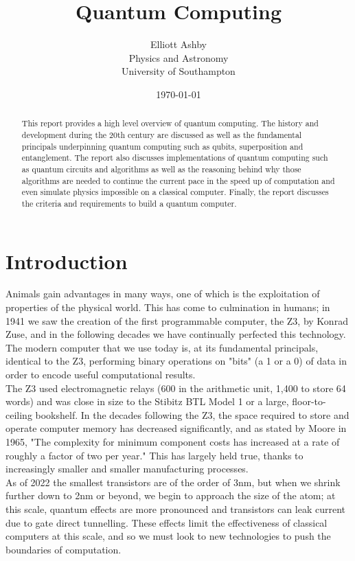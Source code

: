 \documentclass[reqno]{amsart}
\title{Quantum Computing}
\author[Elliott Ashby]{Elliott Ashby \\ Physics and Astronomy \\ University of Southampton}
\date{\monthyeardate\today}
\numberwithin{equation}{section}
\numberwithin{figure}{section}
\begin{document}
\begin{abstract}
    This report provides a high level overview of quantum computing. The history and development during the 20th century are discussed as well as the fundamental principals underpinning quantum computing such as qubits, superposition and entanglement. The report also discusses implementations of quantum computing such as quantum circuits and algorithms as well as the reasoning behind why those algorithms are needed to continue the current pace in the speed up of computation and even simulate physics impossible on a classical computer. Finally, the report discusses the criteria and requirements to build a quantum computer.
\end{abstract}
\maketitle
\tableofcontents
\section{Introduction}
\begin{justify}
Animals gain advantages in many ways, one of which is the exploitation of properties of the physical world. This has come to culmination in humans; in 1941 we saw the creation of the first programmable computer, the Z3, by Konrad Zuse, and in the following decades we have continually perfected this technology. The modern computer that we use today is, at its fundamental principals, identical to the Z3, performing binary operations on "bits" (a 1 or a 0) of data in order to encode useful computational results. \\

The Z3 used electromagnetic relays (600 in the arithmetic unit, 1,400 to store 64 words) and was close in size to the Stibitz BTL Model 1 or a large, floor-to-ceiling bookshelf. \cite{KonradZuseObituary} In the decades following the Z3, the space required to store and operate computer memory has decreased significantly, and as stated by Moore in 1965, "The complexity for minimum component costs has increased at a rate of roughly a factor of two per year." \cite{Moore1965} This has largely held true, thanks to increasingly smaller and smaller manufacturing processes. \\

As of 2022 the smallest transistors are of the order of 3nm, \cite{Samsung_2022} but when we shrink further down to 2nm or beyond, we begin to approach the size of the atom; at this scale, quantum effects are more pronounced and transistors can leak current due to gate direct tunnelling. \cite{2nmGateOxide} These effects limit the effectiveness of classical computers at this scale, and so we must look to new technologies to push the boundaries of computation.
\end{justify}
\end{document}
